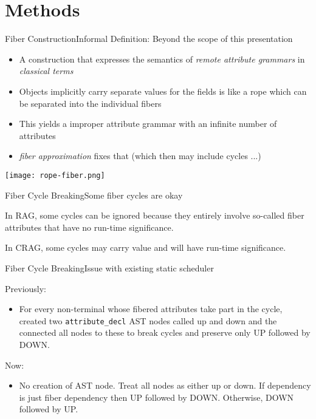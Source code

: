 \section{Methods}


\begin{frame}{Fiber Construction}{Informal Definition: Beyond the scope of this presentation}

\small
\begin{itemize}
    \item A construction that expresses the semantics of \emph{remote attribute grammars} in \emph{classical terms}
    \item Objects implicitly carry separate values for the fields is like a \alert{rope} which can be separated into the individual fibers
    \item This yields a improper attribute grammar with an infinite number of attributes
    \item \emph{fiber approximation} fixes that (which then may include cycles ...)
\end{itemize}

\begin{center}
\texttt{[image: rope-fiber.png]}
\end{center}
    

\end{frame}

\begin{frame}{Fiber Cycle Breaking}{Some fiber cycles are okay}

In RAG, some cycles can be ignored because they entirely involve so-called \alert{fiber attributes} that have no run-time significance. 

In CRAG, some cycles may carry value and will have run-time significance.
\end{frame}

\begin{frame}{Fiber Cycle Breaking}{Issue with existing static scheduler}

Previously:
\begin{itemize}
    \item For every non-terminal whose fibered attributes take part in the cycle, created two \texttt{attribute\_decl} \alert{AST nodes} called up and down and the connected all nodes to these to break cycles and preserve only UP followed by DOWN.
\end{itemize}

Now:

\begin{itemize}
    \item \alert{No creation of AST node}. Treat all nodes as either up or down. If dependency is just fiber dependency then UP followed by DOWN. Otherwise, DOWN followed by UP.
\end{itemize}

\end{frame}


